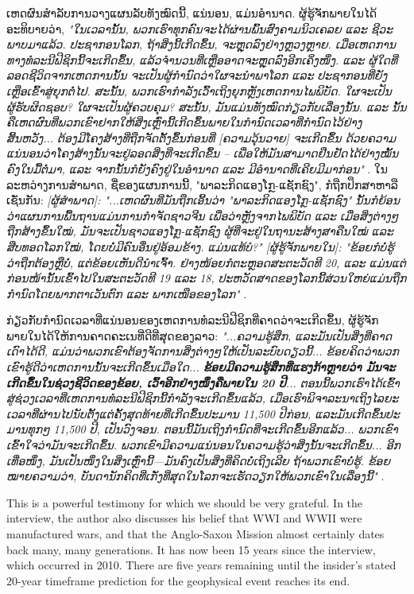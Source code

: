 \documentclass[10pt,twocolumn,letterpaper]{article}
\begin{document}
ເຫດຜົນສໍາລັບການວາງແຜນລັບທັງໝົດນີ້, ແນ່ນອນ, ແມ່ນອຳນາດ. ຜູ້ຮູ້ຈັກພາຍໃນໄດ້ອະທິບາຍວ່າ, \textit{"ໃນເວລານັ້ນ, ພວກ​ເຮົາ​ທຸກ​ຄົນ​ຈະ​ໄດ້​ຜ່ານ​ພົ້ນ​ສົງ​ຄາມ​ນິວ​ເຄລຍ ແລະ ຊີວະ​ພາບ​ມາ​ແລ້ວ. ປະຊາກອນໂລກ, ຖ້າສິ່ງນີ້ເກີດຂຶ້ນ, ຈະຫຼຸດລົງຢ່າງຫຼວງຫຼາຍ. ເມື່ອເຫດການທາງທໍລະນີຟີຊິກນີ້ຈະເກີດຂຶ້ນ, ແລ້ວຈໍານວນທີ່ເຫຼືອອາດຈະຫຼຸດລົງອີກເຄິ່ງໜຶ່ງ. ແລະ ຜູ້ໃດທີ່ລອດຊີວິດຈາກເຫດການນັ້ນ ຈະເປັນຜູ້ກໍານົດວ່າໃຜຈະນຳພາໂລກ ແລະ ປະຊາກອນທີ່ຍັງເຫຼືອເຂົ້າສູ່ຍຸກຕໍ່ໄປ. ສະນັ້ນ, ພວກເຮົາກຳລັງເວົ້າເຖິງຍຸກຫຼັງເຫດການໄພພິບັດ. ໃຜຈະເປັນຜູ້ຮັບຜິດຊອບ? ໃຜຈະເປັນຜູ້ຄວບຄຸມ? ສະນັ້ນ, ມັນແມ່ນທັງໝົດກ່ຽວກັບເລື່ອງນັ້ນ. ແລະ ນັ້ນຄືເຫດຜົນທີ່ພວກເຂົາຢາກໃຫ້ສິ່ງເຫຼົ່ານີ້ເກີດຂຶ້ນພາຍໃນກຳນົດເວລາທີ່ກຳນົດໄວ້ຢ່າງສິ້ນຫວັງ... ຕ້ອງມີໂຄງສ້າງທີ່ຖືກຈັດຕັ້ງຂຶ້ນກ່ອນທີ່ [ຄວາມວຸ້ນວາຍ] ຈະເກີດຂຶ້ນ ດ້ວຍຄວາມແນ່ນອນວ່າໂຄງສ້າງນັ້ນຈະຢູ່ລອດສິ່ງທີ່ຈະເກີດຂຶ້ນ -- ເພື່ອໃຫ້ມັນສາມາດຢືນຢັດໄດ້ຢ່າງໝັ້ນຄົງໃນມື້ຕໍ່ມາ, ແລະ ຈາກນັ້ນກໍຍັງຄົງຢູ່ໃນອຳນາດ ແລະ ມີອຳນາດທີ່ເຄີຍມີມາກ່ອນ"} \cite{4}. ໃນລະຫວ່າງການສຳພາດ, ຊື່ຂອງແຜນການນີ້, "ພາລະກິດແອງໂກຼ-ແຊັກຊົງ", ກໍຖືກປຶກສາຫາລືເຊັ່ນກັນ: \textit{[ຜູ້ສຳພາດ]: "...ເຫດຜົນທີ່ມັນຖືກເອີ້ນວ່າ "ພາລະກິດແອງໂກຼ-ແຊັກຊົງ" ນັ້ນກໍຍ້ອນວ່າແຜນການພື້ນຖານແມ່ນການກຳຈັດຊາວຈີນ ເພື່ອວ່າຫຼັງຈາກໄພພິບັດ ແລະ ເມື່ອສິ່ງຕ່າງໆຖືກສ້າງຂຶ້ນໃໝ່, ມັນຈະເປັນຊາວແອງໂກຼ-ແຊັກຊົງ ຜູ້ທີ່ຈະຢູ່ໃນຖານະສ້າງສາຄືນໃໝ່ ແລະ ສືບທອດໂລກໃໝ່, ໂດຍບໍ່ມີຄົນອື່ນຢູ່ອ້ອມຂ້າງ. ແມ່ນແທ້ບໍ?" [ຜູ້ຮູ້ຈັກພາຍໃນ]: "ຂ້ອຍກໍບໍ່ຮູ້ວ່າຖືກຕ້ອງຫຼືບໍ່, ແຕ່ຂ້ອຍເຫັນດີນຳເຈົ້າ. ຢ່າງໜ້ອຍກໍຕະຫຼອດສະຕະວັດທີ 20, ແລະ ແມ່ນແຕ່ກ່ອນໜ້ານັ້ນເຂົ້າໄປໃນສະຕະວັດທີ 19 ແລະ 18, ປະຫວັດສາດຂອງໂລກນີ້ສ່ວນໃຫຍ່ແມ່ນຖືກກຳນົດໂດຍພາກຕາເວັນຕົກ ແລະ ພາກເໜືອຂອງໂລກ"} \cite{4}.

ກ່ຽວກັບກຳນົດເວລາທີ່ແນ່ນອນຂອງເຫດການທໍລະນີຟີຊິກທີ່ຄາດວ່າຈະເກີດຂຶ້ນ, ຜູ້ຮູ້ຈັກພາຍໃນໄດ້ໃຫ້ການຄາດຄະເນທີ່ດີທີ່ສຸດຂອງລາວ: \textit{"...ຄວາມຮູ້ສຶກ, ແລະມັນເປັນສິ່ງທີ່ຄາດເດົາໄດ້ດີ, ແມ່ນວ່າພວກເຂົາຕ້ອງຈັດການສິ່ງຕ່າງໆໃຫ້ເປັນລະບົບດຽວນີ້... ຂ້ອຍຄິດວ່າພວກເຂົາຮູ້ດີວ່າເຫດການນັ້ນຈະເກີດຂຶ້ນເມື່ອໃດ... \textbf{ຂ້ອຍມີຄວາມຮູ້ສຶກທີ່ແຮງກ້າຫຼາຍວ່າ ມັນຈະເກີດຂຶ້ນໃນຊ່ວງຊີວິດຂອງຂ້ອຍ, ເວົ້າອີກຢ່າງໜຶ່ງຄືພາຍໃນ 20 ປີ}... ຕອນນີ້ພວກເຮົາໄດ້ເຂົ້າສູ່ຊ່ວງເວລາທີ່ເຫດການທໍລະນີຟີຊິກນີ້ກຳລັງຈະເກີດຂຶ້ນແລ້ວ, ເມື່ອເຮົາພິຈາລະນາເຖິງໄລຍະເວລາທີ່ຜ່ານໄປນັບຕັ້ງແຕ່ຄັ້ງສຸດທ້າຍທີ່ເກີດຂຶ້ນປະມານ 11,500 ປີກ່ອນ, ແລະມັນເກີດຂຶ້ນປະມານທຸກໆ 11,500 ປີ, ເປັນວົງຈອນ. ຕອນນີ້ມັນເຖິງກຳນົດທີ່ຈະເກີດຂຶ້ນອີກແລ້ວ... ພວກເຂົາເຂົ້າໃຈວ່າມັນຈະເກີດຂຶ້ນ. ພວກເຂົາມີຄວາມແນ່ນອນໃນຄວາມຮູ້ວ່າສິ່ງນັ້ນຈະເກີດຂຶ້ນ... ອີກເທື່ອໜຶ່ງ, ມັນເປັນໜຶ່ງໃນສິ່ງເຫຼົ່ານີ້—ມັນຄົງເປັນສິ່ງທີ່ຄິດບໍ່ເຖິງເລີຍ ຖ້າພວກເຂົາບໍ່ຮູ້. ຂ້ອຍໝາຍຄວາມວ່າ, ບັນດານັກຄິດທີ່ເກັ່ງທີ່ສຸດໃນໂລກຈະເຮັດວຽກໃຫ້ພວກເຂົາໃນເລື່ອງນີ້"} \cite{4}.

This is a powerful testimony for which we should be very grateful. In the interview, the author also discusses his belief that WWI and WWII were manufactured wars, and that the Anglo-Saxon Mission almost certainly dates back many, many generations. It has now been 15 years since the interview, which occurred in 2010. There are five years remaining until the insider's stated 20-year timeframe prediction for the geophysical event reaches its end.
\end{document}
